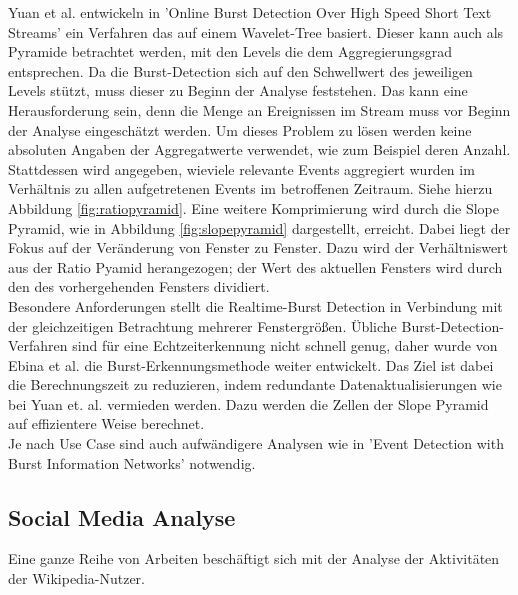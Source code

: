 Yuan et al. entwickeln in 'Online Burst Detection Over High Speed Short Text Streams' \cite{yuan2007online} ein Verfahren das auf einem Wavelet-Tree basiert. Dieser kann auch als Pyramide betrachtet werden, mit den Levels die dem Aggregierungsgrad entsprechen. Da die Burst-Detection sich auf den Schwellwert des jeweiligen Levels stützt, muss dieser zu Beginn der Analyse feststehen. Das kann eine Herausforderung sein, denn  die Menge an Ereignissen im Stream muss vor Beginn der Analyse eingeschätzt werden. Um dieses Problem zu lösen werden keine absoluten Angaben der Aggregatwerte verwendet, wie zum Beispiel deren Anzahl. Stattdessen wird angegeben, wieviele relevante Events aggregiert wurden im Verhältnis zu allen aufgetretenen Events im betroffenen Zeitraum. Siehe hierzu Abbildung \ref{fig:ratiopyramid}. Eine weitere Komprimierung wird durch die Slope Pyramid, wie in Abbildung \ref{fig:slopepyramid} dargestellt, erreicht. Dabei liegt der Fokus auf der Veränderung von Fenster zu Fenster. Dazu wird der Verhältniswert aus der Ratio Pyamid herangezogen; der Wert des aktuellen Fensters wird durch den des vorhergehenden Fensters dividiert.\cite{yuan2007online}\\

Besondere Anforderungen stellt die Realtime-Burst Detection in Verbindung mit der gleichzeitigen Betrachtung mehrerer Fenstergrößen. Übliche Burst-Detection-Verfahren sind für eine Echtzeiterkennung nicht schnell genug, daher wurde von Ebina et al. \cite{ebina2011real} die Burst-Erkennungsmethode weiter entwickelt. Das Ziel ist dabei die Berechnungszeit zu reduzieren, indem redundante Datenaktualisierungen wie bei Yuan et. al. vermieden werden. Dazu werden die Zellen der Slope Pyramid auf effizientere Weise berechnet.\cite{ebina2011real}\\

Je nach Use Case sind auch aufwändigere Analysen wie in 'Event Detection with Burst Information Networks' \cite{ge2016event} notwendig.


\subsection{Social Media Analyse}
Eine ganze Reihe von Arbeiten beschäftigt sich mit der Analyse der Aktivitäten der Wikipedia-Nutzer.

